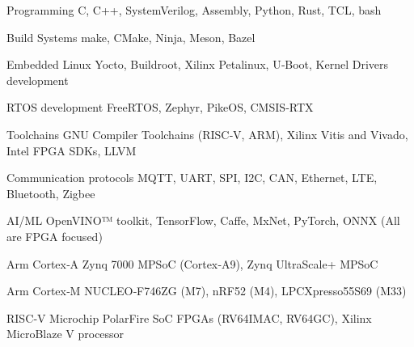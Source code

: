 

\begin{cvskills}

  \cvskill
    {Programming} %
    {C, C++, SystemVerilog, Assembly, Python, Rust, TCL, bash} %

  \cvskill
    {Build Systems} %
    {make, CMake, Ninja, Meson, Bazel} %

  \cvskill
    {Embedded Linux} %
    {Yocto, Buildroot, Xilinx Petalinux, U‑Boot, Kernel Drivers development} %

  \cvskill
    {RTOS development} %
    {FreeRTOS, Zephyr, PikeOS, CMSIS‑RTX} %

  \cvskill
    {Toolchains} %
    {GNU Compiler Toolchains (RISC‑V, ARM), Xilinx Vitis and Vivado, Intel FPGA SDKs, LLVM} %

  \cvskill
  {Communication protocols} %
  {MQTT, UART, SPI, I2C, CAN, Ethernet, LTE, Bluetooth, Zigbee} %

  \cvskill
  {AI/ML} %
  {OpenVINO™ toolkit, TensorFlow, Caffe, MxNet, PyTorch, ONNX (All are FPGA focused)} %

  \cvskill
  {Arm Cortex‑A} %
  {Zynq 7000 MPSoC (Cortex‑A9), Zynq UltraScale+ MPSoC} %

  \cvskill
  {Arm Cortex‑M} %
  {NUCLEO‑F746ZG (M7), nRF52 (M4), LPCXpresso55S69 (M33)} %

  \cvskill
  {RISC‑V} %
  {Microchip PolarFire SoC FPGAs (RV64IMAC, RV64GC), Xilinx MicroBlaze V processor} %


\end{cvskills}
